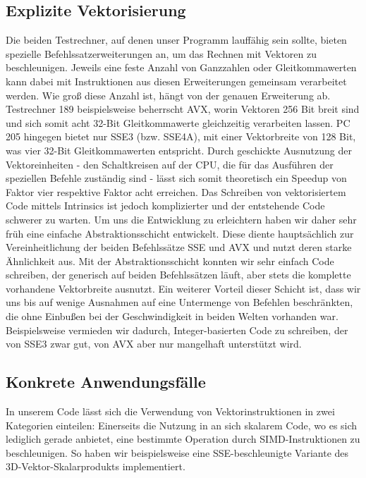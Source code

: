 \subsection{Explizite Vektorisierung}
Die beiden Testrechner, auf denen unser Programm lauffähig sein sollte, bieten spezielle Befehlssatzerweiterungen an, um das Rechnen mit Vektoren zu beschleunigen.
Jeweils eine feste Anzahl von Ganzzahlen oder Gleitkommawerten kann dabei mit Instruktionen aus diesen Erweiterungen gemeinsam verarbeitet werden.
Wie groß diese Anzahl ist, hängt von der genauen Erweiterung ab.
Testrechner 189 beispielsweise beherrscht AVX, worin Vektoren 256 Bit breit sind und sich somit acht 32-Bit Gleitkommawerte gleichzeitig verarbeiten lassen.
PC 205 hingegen bietet nur SSE3 (bzw. SSE4A), mit einer Vektorbreite von 128 Bit, was vier 32-Bit Gleitkommawerten entspricht.
Durch geschickte Ausnutzung der Vektoreinheiten - den Schaltkreisen auf der CPU, die für das Ausführen der speziellen Befehle zuständig sind - lässt sich somit theoretisch ein Speedup von Faktor vier respektive Faktor acht erreichen.
Das Schreiben von vektorisiertem Code mittels Intrinsics ist jedoch komplizierter und der entstehende Code schwerer zu warten.
Um uns die Entwicklung zu erleichtern haben wir daher sehr früh eine einfache Abstraktionsschicht entwickelt.
Diese diente hauptsächlich zur Vereinheitlichung der beiden Befehlssätze SSE und AVX und nutzt deren starke Ähnlichkeit aus.
Mit der Abstraktionsschicht konnten wir sehr einfach Code schreiben, der generisch auf beiden Befehlssätzen läuft, aber stets die komplette vorhandene Vektorbreite ausnutzt.
Ein weiterer Vorteil dieser Schicht ist, dass wir uns bis auf wenige Ausnahmen auf eine Untermenge von Befehlen beschränkten, die ohne Einbußen bei der Geschwindigkeit in beiden Welten vorhanden war.
Beispielsweise vermieden wir dadurch, Integer-basierten Code zu schreiben, der von SSE3 zwar gut, von AVX aber nur mangelhaft unterstützt wird.

\subsection{Konkrete Anwendungsfälle}
In unserem Code lässt sich die Verwendung von Vektorinstruktionen in zwei Kategorien einteilen:
Einerseits die Nutzung in an sich skalarem Code, wo es sich lediglich gerade anbietet, eine bestimmte Operation durch SIMD-Instruktionen zu beschleunigen.
So haben wir beispielsweise eine SSE-beschleunigte Variante des 3D-Vektor-Skalarprodukts implementiert.

